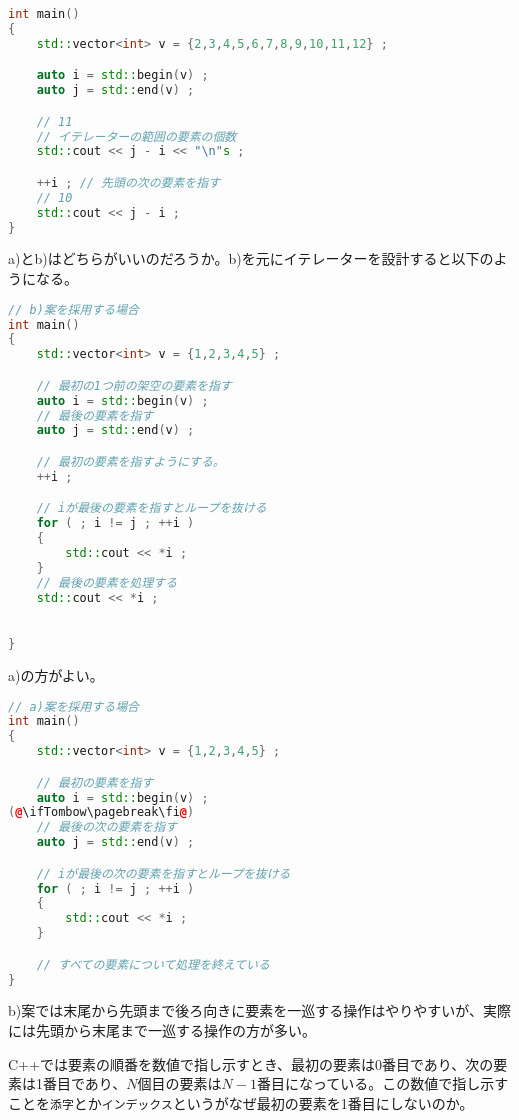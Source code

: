 \begin{lstlisting}[language={C++}]
int main()
{
    std::vector<int> v = {2,3,4,5,6,7,8,9,10,11,12} ;

    auto i = std::begin(v) ;
    auto j = std::end(v) ;

    // 11
    // イテレーターの範囲の要素の個数
    std::cout << j - i << "\n"s ;

    ++i ; // 先頭の次の要素を指す
    // 10
    std::cout << j - i ; 
}
\end{lstlisting}

a)とb)はどちらがいいのだろうか。b)を元にイテレーターを設計すると以下のようになる。

\begin{lstlisting}[language={C++}]
// b)案を採用する場合
int main()
{
    std::vector<int> v = {1,2,3,4,5} ;

    // 最初の1つ前の架空の要素を指す
    auto i = std::begin(v) ;
    // 最後の要素を指す
    auto j = std::end(v) ;

    // 最初の要素を指すようにする。
    ++i ;

    // iが最後の要素を指すとループを抜ける
    for ( ; i != j ; ++i )
    {
        std::cout << *i ;
    }
    // 最後の要素を処理する
    std::cout << *i ;
    

}
\end{lstlisting}

a)の方がよい。

\begin{lstlisting}[language={C++}]
// a)案を採用する場合
int main()
{
    std::vector<int> v = {1,2,3,4,5} ;

    // 最初の要素を指す
    auto i = std::begin(v) ;
(@\ifTombow\pagebreak\fi@)
    // 最後の次の要素を指す
    auto j = std::end(v) ;

    // iが最後の次の要素を指すとループを抜ける
    for ( ; i != j ; ++i )
    {
        std::cout << *i ;
    }

    // すべての要素について処理を終えている
}
\end{lstlisting}

b)案では末尾から先頭まで後ろ向きに要素を一巡する操作はやりやすいが、実際には先頭から末尾まで一巡する操作の方が多い。

C++では要素の順番を数値で指し示すとき、最初の要素は0番目であり、次の要素は1番目であり、\(N\)個目の要素は\(N-1\)番目になっている。この数値で指し示すことを\texttt{添字}とか\texttt{インデックス}というがなぜ最初の要素を1番目にしないのか。

